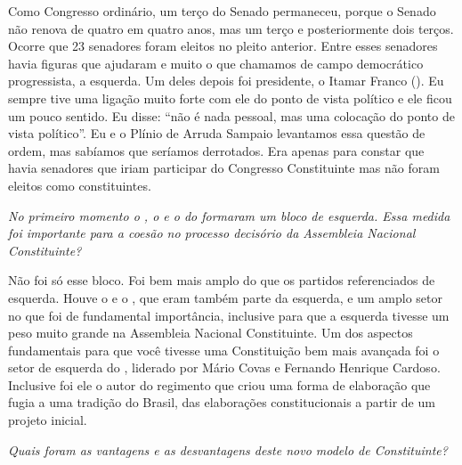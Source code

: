 Como Congresso ordinário, um terço do Senado permaneceu, porque o Senado
não renova de quatro em quatro anos, mas um terço e posteriormente dois
terços. Ocorre que 23 senadores foram eleitos no pleito anterior. Entre
esses senadores havia figuras que ajudaram e muito o que chamamos de
campo democrático progressista, a esquerda. Um deles depois foi
presidente, o Itamar Franco (). Eu sempre tive uma ligação muito
forte com ele do ponto de vista político e ele ficou um pouco sentido.
Eu disse: ``não é nada pessoal, mas uma colocação do ponto de vista
político''. Eu e o Plínio de Arruda Sampaio levantamos essa questão de
ordem, mas sabíamos que seríamos derrotados. Era apenas para constar que
havia senadores que iriam participar do Congresso Constituinte mas não
foram eleitos como constituintes.

\medskip

\noindent\emph{No primeiro momento o , o  e o do formaram um bloco de
esquerda. Essa medida foi importante para a coesão no processo decisório
da Assembleia Nacional Constituinte?}

Não foi só esse bloco. Foi bem mais amplo do que os
partidos referenciados de esquerda. Houve o  e o , que eram também
parte da esquerda, e um amplo setor no  que foi de fundamental
importância, inclusive para que a esquerda tivesse um peso muito grande
na Assembleia Nacional Constituinte. Um dos aspectos fundamentais para
que você tivesse uma Constituição bem mais avançada foi o setor de
esquerda do , liderado por Mário Covas e Fernando Henrique Cardoso.
Inclusive foi ele o autor do regimento que criou uma forma de elaboração
que fugia a uma tradição do Brasil, das elaborações constitucionais a
partir de um projeto inicial.

\medskip

\noindent\emph{Quais foram as vantagens e as desvantagens deste novo modelo de
Constituinte?}

